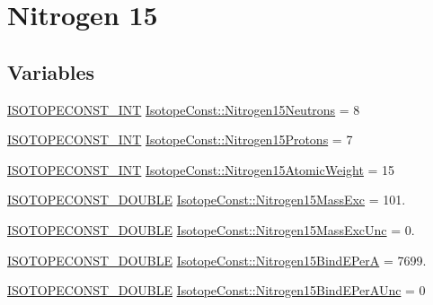 \hypertarget{group___isotope_const-_nitrogen-_n15}{}\section{Nitrogen 15}
\label{group___isotope_const-_nitrogen-_n15}
\subsection*{Variables}
\begin{DoxyCompactItemize}
\item 
\mbox{\hyperlink{group___isotope_const-_macros_ga5f18360b3e99483a35c32d789e62621c}{I\+S\+O\+T\+O\+P\+E\+C\+O\+N\+S\+T\+\_\+\+I\+NT}} \mbox{\hyperlink{group___isotope_const-_nitrogen-_n15_ga20bb1f7c35bbf573267574412f4dba25}{Isotope\+Const\+::\+Nitrogen15\+Neutrons}} = 8
\item 
\mbox{\hyperlink{group___isotope_const-_macros_ga5f18360b3e99483a35c32d789e62621c}{I\+S\+O\+T\+O\+P\+E\+C\+O\+N\+S\+T\+\_\+\+I\+NT}} \mbox{\hyperlink{group___isotope_const-_nitrogen-_n15_ga85c45bc47a2081bcab63e7fac31e1111}{Isotope\+Const\+::\+Nitrogen15\+Protons}} = 7
\item 
\mbox{\hyperlink{group___isotope_const-_macros_ga5f18360b3e99483a35c32d789e62621c}{I\+S\+O\+T\+O\+P\+E\+C\+O\+N\+S\+T\+\_\+\+I\+NT}} \mbox{\hyperlink{group___isotope_const-_nitrogen-_n15_ga8006e4f6966fe97819aaddab747fb7fd}{Isotope\+Const\+::\+Nitrogen15\+Atomic\+Weight}} = 15
\item 
\mbox{\hyperlink{group___isotope_const-_macros_ga8f45a7272ce02c0b4c65c44636ed719a}{I\+S\+O\+T\+O\+P\+E\+C\+O\+N\+S\+T\+\_\+\+D\+O\+U\+B\+LE}} \mbox{\hyperlink{group___isotope_const-_nitrogen-_n15_gae0f01c3b6ea6ae0cd44a57b260b7dc53}{Isotope\+Const\+::\+Nitrogen15\+Mass\+Exc}} = 101.
\item 
\mbox{\hyperlink{group___isotope_const-_macros_ga8f45a7272ce02c0b4c65c44636ed719a}{I\+S\+O\+T\+O\+P\+E\+C\+O\+N\+S\+T\+\_\+\+D\+O\+U\+B\+LE}} \mbox{\hyperlink{group___isotope_const-_nitrogen-_n15_gaf6fe76206d86dd8821ee75ab98cd9c98}{Isotope\+Const\+::\+Nitrogen15\+Mass\+Exc\+Unc}} = 0.
\item 
\mbox{\hyperlink{group___isotope_const-_macros_ga8f45a7272ce02c0b4c65c44636ed719a}{I\+S\+O\+T\+O\+P\+E\+C\+O\+N\+S\+T\+\_\+\+D\+O\+U\+B\+LE}} \mbox{\hyperlink{group___isotope_const-_nitrogen-_n15_gaa9c9fc6e954f57b64b8a383eb0a4d784}{Isotope\+Const\+::\+Nitrogen15\+Bind\+E\+PerA}} = 7699.
\item 
\mbox{\hyperlink{group___isotope_const-_macros_ga8f45a7272ce02c0b4c65c44636ed719a}{I\+S\+O\+T\+O\+P\+E\+C\+O\+N\+S\+T\+\_\+\+D\+O\+U\+B\+LE}} \mbox{\hyperlink{group___isotope_const-_nitrogen-_n15_gad23f63fd48b9c717ec702bb9eb48e063}{Isotope\+Const\+::\+Nitrogen15\+Bind\+E\+Per\+A\+Unc}} = 0

\end{DoxyCompactItemize}
